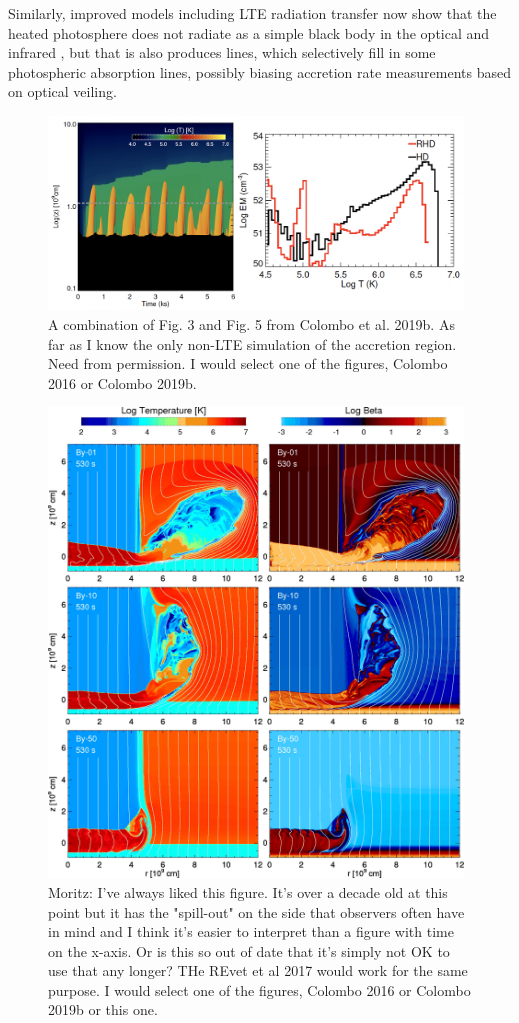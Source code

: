 Similarly, improved models including LTE radiation transfer now show that the heated photosphere does not radiate as a simple black body in the optical and infrared \cite{Dodin_2012,Dodin_2013}, but that is also produces lines, which selectively fill in some photospheric absorption lines, possibly biasing accretion rate measurements based on optical veiling.



\begin{figure}
    \centering
    \includegraphics[width=11cm]{figs/colombo2019b.png}
    \caption{A combination of Fig. 3 and Fig. 5 from Colombo et al. 2019b. As far as I know the only non-LTE simulation of the accretion region. Need from permission. I would select one of the figures, Colombo 2016 or Colombo 2019b.}
    \label{fig:colombo2016}
\end{figure}

\begin{figure}
    \centering
    \includegraphics[width=11cm]{figs/Sacco2010.png}
    \caption{Moritz: I've always liked this figure. It's over a decade old at this point but it has the "spill-out" on the side that observers often have in mind and I think it's easier to interpret than a figure with time on the x-axis. Or is this so out of date that it's simply not OK to use that any longer? THe REvet et al 2017 would work for the same purpose. I would select one of the figures, Colombo 2016 or Colombo 2019b or this one.}
    \label{fig:sacco2016}
\end{figure}

